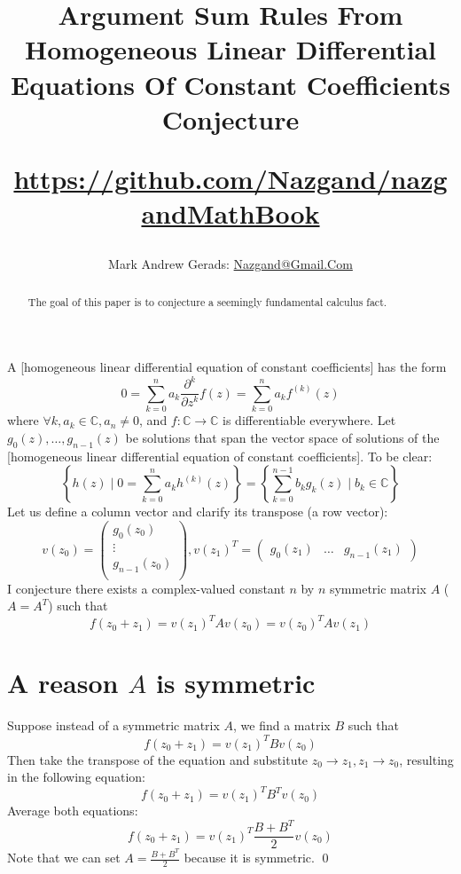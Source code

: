 \documentclass[]{article}
\author{Mark Andrew Gerads: \href{MailTo:Nazgand@Gmail.Com}{Nazgand@Gmail.Com}}
\title{
	Argument Sum Rules From Homogeneous Linear Differential Equations Of Constant Coefficients Conjecture
	
	\href{https://github.com/Nazgand/nazgandMathBook}{https://github.com/Nazgand/nazgandMathBook}
}
\newcommand{\pqty}[1]{{\left(#1\right)}}
\newcommand{\Bqty}[1]{{\left\{#1\right\}}}
\newcommand{\pdiff}[2]{\frac{\partial^{#2}}{\partial #1^{#2}}}
\numberwithin{equation}{section}
\begin{document}
	
	\maketitle
	
	\begin{abstract}
		The goal of this paper is to conjecture a seemingly fundamental calculus fact.
	\end{abstract}
	
	A [homogeneous linear differential equation of constant coefficients] has the form
	\begin{equation}
		0=\sum_{k=0}^{n}a_k\pdiff{z}{k}f\pqty{z}
		=\sum_{k=0}^{n}a_k f^\pqty{k}\pqty{z}
	\end{equation}
	where $\forall k, a_k\in\mathbb{C}, a_n \neq 0$, and $f:\mathbb{C}\to\mathbb{C}$ is differentiable everywhere.
	Let $g_0\pqty{z},\dots,g_{n-1}\pqty{z}$ be solutions that span the vector space of solutions of the [homogeneous linear differential equation of constant coefficients]. To be clear:
	\begin{equation}
		\Bqty{h\pqty{z} \mid 0=\sum_{k=0}^{n}a_k h^\pqty{k}\pqty{z}}
		=\Bqty{\sum_{k=0}^{n-1}b_k g_k\pqty{z} \mid b_k\in\mathbb{C}}
	\end{equation}
	Let us define a column vector and clarify its transpose (a row vector):
	\begin{equation}
		v\pqty{z_0}=
		\begin{pmatrix}
			g_0\pqty{z_0} \\
			\vdots \\
			g_{n-1}\pqty{z_0} \\
		\end{pmatrix}
		,
		v\pqty{z_1}^T=
		\begin{pmatrix}
			g_0\pqty{z_1} &
			\dots &
			g_{n-1}\pqty{z_1}
		\end{pmatrix}
	\end{equation}
	I conjecture there exists a complex-valued constant $n$ by $n$ symmetric matrix $A$ ($A=A^T$) such that
	\begin{equation}
		f\pqty{z_0+z_1}=v\pqty{z_1}^T A v\pqty{z_0}=v\pqty{z_0}^T A v\pqty{z_1}
	\end{equation}

	\section{A reason $A$ is symmetric}
	Suppose instead of a symmetric matrix $A$, we find a matrix $B$ such that
	\begin{equation}
		f\pqty{z_0+z_1}=v\pqty{z_1}^T B v\pqty{z_0}
	\end{equation}
	Then take the transpose of the equation and substitute $z_0\to z_1,z_1\to z_0$, resulting in the following equation:
	\begin{equation}
		f\pqty{z_0+z_1}=v\pqty{z_1}^T B^T v\pqty{z_0}
	\end{equation}
	Average both equations:
	\begin{equation}
		f\pqty{z_0+z_1}=v\pqty{z_1}^T \frac{B+B^T}{2} v\pqty{z_0}
	\end{equation}
	Note that we can set $A=\frac{B+B^T}{2}$ because it is symmetric. \qed
\end{document}
